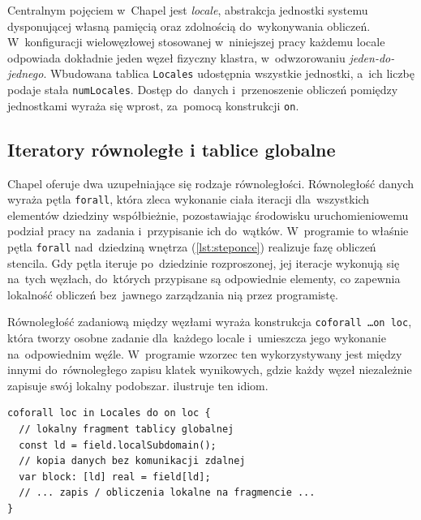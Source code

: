 Centralnym pojęciem w~Chapel jest \emph{locale}, abstrakcja jednostki
systemu dysponującej własną pamięcią oraz zdolnością do~wykonywania obliczeń.
W~konfiguracji wielowęzłowej stosowanej w~niniejszej pracy każdemu
locale odpowiada dokładnie jeden węzeł fizyczny klastra, w~odwzorowaniu
\emph{jeden-do-jednego}. Wbudowana tablica \texttt{Locales} udostępnia wszystkie
jednostki, a~ich liczbę podaje stała \texttt{numLocales}. Dostęp
do~danych i~przenoszenie obliczeń pomiędzy jednostkami wyraża się wprost,
za~pomocą konstrukcji \texttt{on}.

\subsection{Iteratory równoległe i tablice globalne}

Chapel oferuje dwa uzupełniające się rodzaje równoległości. Równoległość danych
wyraża pętla \texttt{forall}, która zleca wykonanie ciała iteracji dla~wszystkich
elementów dziedziny współbieżnie, pozostawiając środowisku uruchomieniowemu
podział pracy na~zadania i~przypisanie ich do~wątków. W~programie to właśnie
pętla \texttt{forall} nad~dziedziną wnętrza (\cref{lst:steponce}) realizuje fazę
obliczeń stencila. Gdy pętla iteruje po~dziedzinie rozproszonej, jej iteracje
wykonują się na~tych węzłach, do~których przypisane są odpowiednie elementy,
co zapewnia lokalność obliczeń bez~jawnego zarządzania nią przez programistę.

Równoległość zadaniową między węzłami wyraża konstrukcja
\texttt{coforall \ldots on loc}, która tworzy osobne zadanie dla~każdego locale
i~umieszcza jego wykonanie na~odpowiednim węźle. W~programie wzorzec ten
wykorzystywany jest między innymi do~równoległego zapisu klatek wynikowych, gdzie każdy węzeł niezależnie zapisuje swój lokalny podobszar. 
ilustruje ten idiom.

\begin{lstlisting}[language=Chapel,caption={Równoległość zadaniowa między węzłami:
każdy locale wykonuje operację na~swoim lokalnym podobszarze danych.},label={lst:coforall}]
coforall loc in Locales do on loc {
  // lokalny fragment tablicy globalnej
  const ld = field.localSubdomain();
  // kopia danych bez komunikacji zdalnej   
  var block: [ld] real = field[ld];    
  // ... zapis / obliczenia lokalne na fragmencie ...
}
\end{lstlisting}

